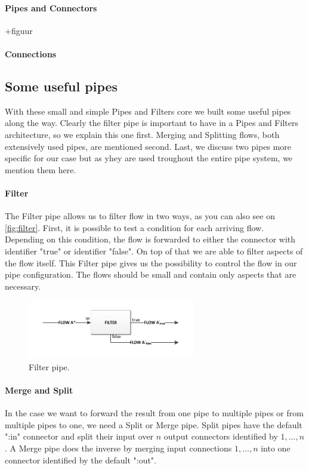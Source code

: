 \paragraph{Pipes and Connectors} +figuur

\paragraph{Connections} %

\subsection{Some useful pipes}

With these small and simple Pipes and Filters core we built some useful pipes along the way. Clearly the filter pipe is important to have in a Pipes and Filters architecture, so we explain this one first. Merging and Splitting flows, both extensively used pipes, are mentioned second. Last, we discuss two pipes more specific for our case but as yhey are used troughout the entire pipe system, we mention them here.

\paragraph{Filter} The Filter pipe allows us to filter flow in two ways, as you can also see on \autoref{fig:filter}. First, it is possible to test a condition for each arriving flow. Depending on this condition, the flow is forwarded to either the connector with identifier "true" or identifier "false". On top of that we are able to filter aspects of the flow itself. This Filter pipe gives us the possibility to control the flow in our pipe configuration. The flows should be small and contain only aspects that are necessary.

\begin{figure}[htbp]
	\centering
		\includegraphics[width=0.65\textwidth]{fig/filter}
	\caption{Filter pipe.}
	\label{fig:filter}
\end{figure}

\paragraph{Merge and Split} In the case we want to forward the result from one pipe to multiple pipes or from multiple pipes to one, we need a Split or Merge pipe. Split pipes have the default ":in" connector and split their input over $n$ output connectors identified by $1,\ldots,n$. A Merge pipe does the inverse by merging input connections $1,\ldots,n$ into one connector identified by the default ":out".

